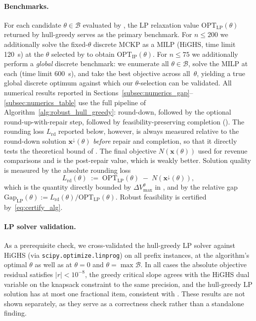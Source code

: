 \documentclass[11pt, a4paper]{article}
\theoremstyle{plain}
\theoremstyle{definition}
\theoremstyle{remark}
\begin{document}
\paragraph{Benchmarks.}
For each candidate $\theta\in\mathcal B$ evaluated by
, the LP relaxation value
$\mathrm{OPT}_{\mathrm{LP}}(\theta)$ returned by hull-greedy serves as the primary benchmark.
For $n\le 200$ we additionally solve the fixed-$\theta$ discrete MCKP as a MILP
(HiGHS, time limit \SI{120}{\second}) at the $\theta$ selected by
 to obtain $\mathrm{OPT}_{\mathrm{IP}}(\theta)$.
For $n\le 75$ we additionally perform a \emph{global} discrete benchmark: we enumerate all
$\theta\in\mathcal B$, solve the MILP at each (time limit \SI{600}{\second}), and take the best
objective across all~$\theta$, yielding a true global discrete optimum against which our
$\theta$-selection can be validated.
All numerical results reported in Sections~\ref{subsec:numerics_gap}--\ref{subsec:numerics_table} use the full pipeline of Algorithm~\ref{alg:robust_hull_greedy}: round-down, followed by the optional round-up-with-repair step, followed by feasibility-preserving completion (). The rounding loss $L_{\mathrm{rd}}$ reported below, however, is always measured relative to the round-down solution $\bm x^{\downarrow}(\theta)$ \emph{before} repair and completion, so that it directly tests the theoretical bound of . The final objective $N(\bm x(\theta))$ used for revenue comparisons and  is the post-repair value, which is weakly better.
Solution quality is measured by the absolute rounding loss
\[
L_{\mathrm{rd}}(\theta)
\;:=\;\mathrm{OPT}_{\mathrm{LP}}(\theta)\;-\;N(\bm x^{\downarrow}(\theta)),
\]
which is the quantity directly bounded by $\Delta V_{\max}^\theta$ in
, and by the relative gap
$\mathrm{Gap}_{\mathrm{LP}}(\theta):=L_{\mathrm{rd}}(\theta)/\mathrm{OPT}_{\mathrm{LP}}(\theta)$.
Robust feasibility is certified by~\eqref{eq:certify_alg}.

\paragraph{LP solver validation.}
As a prerequisite check, we cross-validated the hull-greedy LP solver against HiGHS
(via \texttt{scipy.optimize.linprog}) on all prefix instances, at the algorithm's optimal
$\theta$ as well as at $\theta=0$ and $\theta=\max\mathcal B$.
In all cases the absolute objective residual satisfies $|r|<10^{-8}$, the greedy critical slope
agrees with the HiGHS dual variable on the knapsack constraint to the same precision, and the
hull-greedy LP solution has at most one fractional item, consistent with .
These results are not shown separately, as they serve as a correctness check rather than a
standalone finding.
\end{document}
